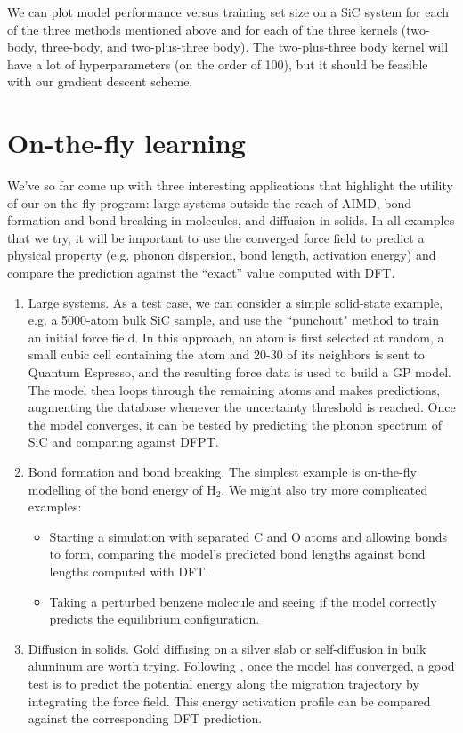 \documentclass[%
reprint,
amsmath,amssymb,
aps,
]{revtex4-1}
\begin{document}
\begin{enumerate}
We can plot model performance versus training set size on a SiC system for each of the three methods mentioned above and for each of the three kernels (two-body, three-body, and two-plus-three body). The two-plus-three body kernel will have a lot of hyperparameters (on the order of 100), but it should be feasible with our gradient descent scheme.
\end{enumerate}

\section{On-the-fly learning}
We've so far come up with three interesting applications that highlight the utility of our on-the-fly program: large systems outside the reach of AIMD, bond formation and bond breaking in molecules, and diffusion in solids. In all examples that we try, it will be important to use the converged force field to predict a physical property (e.g. phonon dispersion, bond length, activation energy) and compare the prediction against the ``exact'' value computed with DFT.

\begin{enumerate}
\item Large systems. As a test case, we can consider a simple solid-state example, e.g. a 5000-atom bulk SiC sample, and use the ``punchout" method to train an initial force field. In this approach, an atom is first selected at random, a small cubic cell containing the atom and 20-30 of its neighbors is sent to Quantum Espresso, and the resulting force data is used to build a GP model. The model then loops through the remaining atoms and makes predictions, augmenting the database whenever the uncertainty threshold is reached. Once the model converges, it can be tested by predicting the phonon spectrum of SiC and comparing against DFPT.

\item Bond formation and bond breaking. The simplest example is on-the-fly modelling of the bond energy of $\text{H}_2$. We might also try more complicated examples: 
\begin{itemize}
\item Starting a simulation with separated C and O atoms and allowing bonds to form, comparing the model's predicted bond lengths against bond lengths computed with DFT.
\item Taking a perturbed benzene molecule and seeing if the model correctly predicts the equilibrium configuration.
\end{itemize}

\item Diffusion in solids. Gold diffusing on a silver slab or self-diffusion in bulk aluminum are worth trying. Following \cite{botu2015adaptive, botu2015learning}, once the model has converged, a good test is to predict the potential energy along the migration trajectory by integrating the force field. This energy activation profile can be compared against the corresponding DFT prediction.

\end{enumerate}



\end{document}
